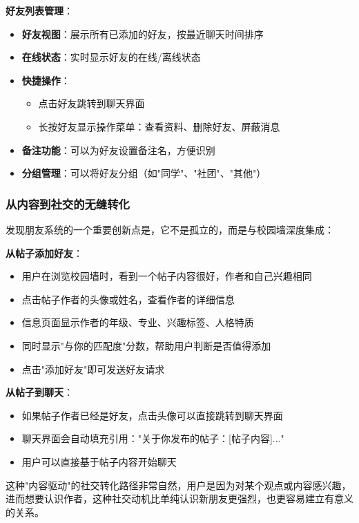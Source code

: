 \documentclass[12pt,a4paper]{article}
\begin{document}
\textbf{好友列表管理}：
\begin{itemize}
    \item \textbf{好友视图}：展示所有已添加的好友，按最近聊天时间排序
    \item \textbf{在线状态}：实时显示好友的在线/离线状态
    \item \textbf{快捷操作}：
        \begin{itemize}
            \item 点击好友跳转到聊天界面
            \item 长按好友显示操作菜单：查看资料、删除好友、屏蔽消息
        \end{itemize}
    \item \textbf{备注功能}：可以为好友设置备注名，方便识别
    \item \textbf{分组管理}：可以将好友分组（如"同学"、"社团"、"其他"）
\end{itemize}

\subsubsection{从内容到社交的无缝转化}

发现朋友系统的一个重要创新点是，它不是孤立的，而是与校园墙深度集成：

\textbf{从帖子添加好友}：
\begin{itemize}
    \item 用户在浏览校园墙时，看到一个帖子内容很好，作者和自己兴趣相同
    \item 点击帖子作者的头像或姓名，查看作者的详细信息
    \item 信息页面显示作者的年级、专业、兴趣标签、人格特质
    \item 同时显示"与你的匹配度"分数，帮助用户判断是否值得添加
    \item 点击"添加好友"即可发送好友请求
\end{itemize}

\textbf{从帖子到聊天}：
\begin{itemize}
    \item 如果帖子作者已经是好友，点击头像可以直接跳转到聊天界面
    \item 聊天界面会自动填充引用："关于你发布的帖子：[帖子内容]..."
    \item 用户可以直接基于帖子内容开始聊天
\end{itemize}

这种"内容驱动"的社交转化路径非常自然，用户是因为对某个观点或内容感兴趣，进而想要认识作者，这种社交动机比单纯认识新朋友更强烈，也更容易建立有意义的关系。
\end{document}
